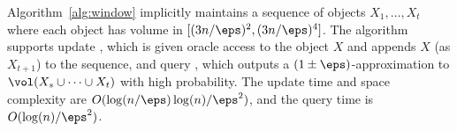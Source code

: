 %
\begin{algorithm}[htb]
    \caption{Streaming algorithm for union volume estimation}
    \label{alg:window}
\end{algorithm}
%
\begin{theorem}
\label{thm:windowalgo2}
    Algorithm~\ref{alg:window} implicitly maintains a sequence of objects $X_1, \dots, X_t$ where each object has volume in $[(3n/\eps)^2, (3n/\eps)^4]$. The algorithm supports update , which is given oracle access to the object $X$ and appends $X$ (as $X_{t+1}$) to the sequence, and query , which outputs a $(1\pm\eps)$-approximation to $\vol(X_s \cup \cdots \cup X_t)$ with high probability. The update time and space complexity are $O(\log(n/\eps) \log(n)/\eps^2)$, and the query time is $O(\log(n)/\eps^2)$.
\end{theorem}
%
